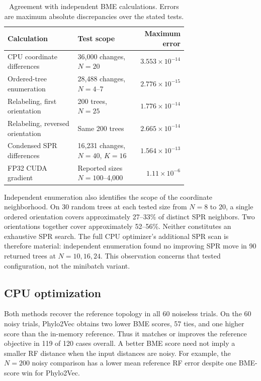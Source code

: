 \documentclass[11pt,a4paper]{article}
\makeatletter
\DeclareRobustCommand{\_}{\ifmmode\nfss@text{\textunderscore}\else\textunderscore\allowbreak\fi}
\theoremstyle{definition}
\makeatother
\begin{document}
\begin{table}[tb]
\centering
\caption{Agreement with independent BME calculations. Errors are maximum absolute discrepancies over the stated tests.}
\label{tab:validation}
\small
\begin{tabular}{@{}p{0.39\linewidth}p{0.32\linewidth}r@{}}
\toprule
Calculation & Test scope & Maximum error\\
\midrule
CPU coordinate differences & 36,000 changes, $N=20$ & $3.553\times10^{-14}$\\
Ordered-tree enumeration & 28,488 changes, $N=4$--7 & $2.776\times10^{-15}$\\
Relabeling, first orientation & 200 trees, $N=25$ & $1.776\times10^{-14}$\\
Relabeling, reversed orientation & Same 200 trees & $2.665\times10^{-14}$\\
Condensed SPR differences & 16,231 changes, $N=40$, $K=16$ & $1.564\times10^{-13}$\\
FP32 CUDA gradient & Reported sizes $N=100$--4,000 & $1.11\times10^{-6}$\\
\bottomrule
\end{tabular}
\end{table}

Independent enumeration also identifies the scope of the coordinate neighborhood.
On 30 random trees at each tested size from $N=8$ to $20$, a single ordered orientation covers approximately 27--33\% of distinct SPR neighbors.
Two orientations together cover approximately 52--56\%.
Neither constitutes an exhaustive SPR search.
The full CPU optimizer's additional SPR scan is therefore material: independent enumeration found no improving SPR move in 90 returned trees at $N=10,16,24$.
This observation concerns that tested configuration, not the minibatch variant.

\subsection{CPU optimization}

Both methods recover the reference topology in all 60 noiseless trials.
On the 60 noisy trials, Phylo2Vec obtains two lower BME scores, 57 ties, and one higher score than the in-memory reference.
Thus it matches or improves the reference objective in 119 of 120 cases overall.
A better BME score need not imply a smaller RF distance when the input distances are noisy.
For example, the $N=200$ noisy comparison has a lower mean reference RF error despite one BME-score win for Phylo2Vec.
\end{document}
